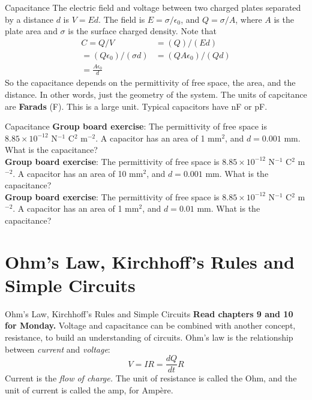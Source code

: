 \documentclass{beamer}
\begin{document}
\begin{frame}{Capacitance}
The electric field and voltage between two charged plates separated by a distance $d$ is $V = Ed$.  The field is $E = \sigma/\epsilon_0$, and $Q = \sigma/A$, where $A$ is the plate area and $\sigma$ is the surface charged density.  Note that
\begin{align}
C = Q/V &= (Q)/(E d) \\
= (Q \epsilon_0)/(\sigma d) &= (Q A \epsilon_0)/(Q d) \\
= \frac{A \epsilon_0}{d} &
\end{align}
So the capacitance depends on the permittivity of free space, the area, and the distance.  In other words, just the geometry of the system.  The units of capcitance are \textbf{\alert{Farads}} (F).  This is a large unit.  Typical capacitors have nF or pF.
\end{frame}

\begin{frame}{Capacitance}
\textbf{Group board exercise}: The permittivity of free space is $8.85 \times 10^{-12}$ N$^{-1}$ C$^2$ m$^{-2}$.  A capacitor has an area of 1 mm$^2$, and $d = 0.001$ mm.  What is the capacitance? \\ 
\textbf{Group board exercise}: The permittivity of free space is $8.85 \times 10^{-12}$ N$^{-1}$ C$^2$ m$^{-2}$.  A capacitor has an area of 10 mm$^2$, and $d = 0.001$ mm.  What is the capacitance? \\
\textbf{Group board exercise}: The permittivity of free space is $8.85 \times 10^{-12}$ N$^{-1}$ C$^2$ m$^{-2}$.  A capacitor has an area of 1 mm$^2$, and $d = 0.01$ mm.  What is the capacitance?
\end{frame}

\section{Ohm's Law, Kirchhoff's Rules and Simple Circuits}

\begin{frame}{Ohm's Law, Kirchhoff's Rules and Simple Circuits}
\textbf{Read chapters 9 and 10 for Monday.}
Voltage and capacitance can be combined with another concept, \alert{resistance}, to build an understanding of \alert{circuits}.  Ohm's law is the relationship between \textit{current} and \textit{voltage}:
\begin{equation}
V = I R = \frac{dQ}{dt}R
\end{equation}
Current is the \textit{flow of charge.}  The unit of resistance is called the Ohm, and the unit of current is called the amp, for Amp\`{e}re.
\end{frame}
\end{document}
